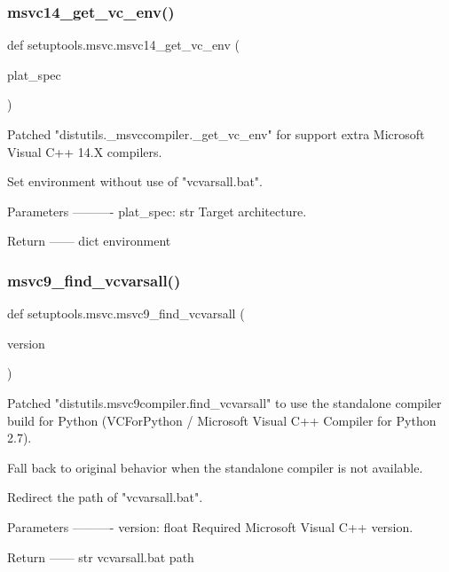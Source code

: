 \subsubsection{\texorpdfstring{msvc14\+\_\+get\+\_\+vc\+\_\+env()}{msvc14\_get\_vc\_env()}}
{\footnotesize\ttfamily def setuptools.\+msvc.\+msvc14\+\_\+get\+\_\+vc\+\_\+env (\begin{DoxyParamCaption}\item[{}]{plat\+\_\+spec }\end{DoxyParamCaption})}

\begin{DoxyVerb}Patched "distutils._msvccompiler._get_vc_env" for support extra
Microsoft Visual C++ 14.X compilers.

Set environment without use of "vcvarsall.bat".

Parameters
----------
plat_spec: str
    Target architecture.

Return
------
dict
    environment
\end{DoxyVerb}
 \mbox{\label{namespacesetuptools_1_1msvc_a4ee903451bc75bf16dbdd14461ed230f}} 
\subsubsection{\texorpdfstring{msvc9\+\_\+find\+\_\+vcvarsall()}{msvc9\_find\_vcvarsall()}}
{\footnotesize\ttfamily def setuptools.\+msvc.\+msvc9\+\_\+find\+\_\+vcvarsall (\begin{DoxyParamCaption}\item[{}]{version }\end{DoxyParamCaption})}

\begin{DoxyVerb}Patched "distutils.msvc9compiler.find_vcvarsall" to use the standalone
compiler build for Python
(VCForPython / Microsoft Visual C++ Compiler for Python 2.7).

Fall back to original behavior when the standalone compiler is not
available.

Redirect the path of "vcvarsall.bat".

Parameters
----------
version: float
    Required Microsoft Visual C++ version.

Return
------
str
    vcvarsall.bat path
\end{DoxyVerb}
 \mbox{\label{namespacesetuptools_1_1msvc_afdbaf4f7d94d7e19c621a4632d9a8027}} 
